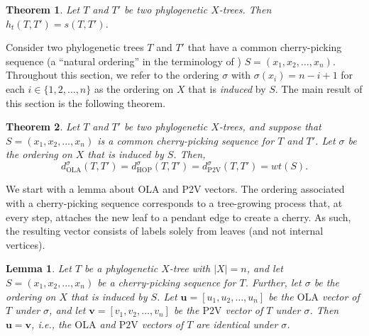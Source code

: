 \documentclass{article}
\newtheorem{lemma}{Lemma}
\newtheorem{theorem}{Theorem}
\newcommand{\HOP}{\mathrm{HOP}}
\newcommand{\OLA}{\mathrm{OLA}}
\newcommand{\PV}{\mathrm{P2V}}
\begin{document}
\begin{theorem}\label{t:CPS}
Let $T$ and $T'$ be two phylogenetic $X$-trees. Then $h_t(T,T')=s(T,T')$.
\end{theorem}

Consider two phylogenetic trees $T$ and $T'$ that have a common cherry-picking sequence (a ``natural ordering'' in the terminology of \cite{penn2023leaping}) $S = (x_1, x_2,\ldots, x_n)$. Throughout this section, we refer to the ordering $\sigma$ with $\sigma(x_i)=n-i+1$ for each $i \in \{1,2,\ldots,n\}$ as the ordering on $X$ that is {\em induced} by $S$. The main result of this section is the following theorem.

\begin{theorem}
    Let $T$ and $T'$ be two phylogenetic $X$-trees, and suppose that $S=(x_1, x_2, \ldots, x_n)$ is a common cherry-picking sequence for $T$ and $T'$. Let $\sigma$ be the ordering on $X$ that is induced by $S$.
    Then, 
    $$
    d_{\OLA}^{\sigma}(T,T') = 
    d_{\HOP}^{\sigma}(T,T') =
    d_{\PV}^{\sigma}(T,T') = wt(S).
    $$
    \label{thm:cherry-pick-equiv}
\end{theorem}

We start with a lemma about OLA and P2V vectors.  The ordering associated with a cherry-picking sequence corresponds to a tree-growing process that, at every step, attaches the new leaf to a pendant edge to create a cherry. As such, the resulting vector consists of labels solely from leaves (and not internal vertices).     

\begin{lemma}\label{l:cherry-ordering}
    Let $T$ be a phylogenetic $X$-tree with $|X|=n$, 
    and let $S = (x_1,x_2, \ldots, x_n)$ be a cherry-picking sequence for $T$. Further, let $\sigma$ be the ordering on $X$ that is induced by $S$.
    Let $\mathbf{u}=[u_1,u_2, \ldots, u_n]$ be the $\OLA$ vector of $T$ under $\sigma$, and let $\mathbf{v}=[v_1,v_2, \ldots, v_n]$ be the $\PV$ vector of $T$ under $\sigma$. Then $\mathbf{u} = \mathbf{v}$, i.e., the $\OLA$ and $\PV$ vectors of $T$ are identical under $\sigma$. 
\end{lemma}
\end{document}
